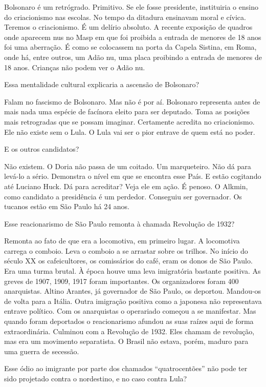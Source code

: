  Bolsonaro é um retrógrado. Primitivo. Se ele fosse presidente,
instituiria o ensino do criacionismo nas escolas. No tempo da ditadura
ensinavam moral e cívica. Teremos o criacionismo. É um delírio absoluto.
A recente exposição de quadros onde aparecem nus no Masp em que foi
proibida a entrada de menores de 18 anos foi uma aberração. É como se
colocassem na porta da Capela Sistina, em Roma, onde há, entre outros,
um Adão nu, uma placa proibindo a entrada de menores de 18 anos.
Crianças não podem ver o Adão nu.

 Essa mentalidade cultural explicaria a ascensão de Bolsonaro?

 Falam no fascismo de Bolsonaro. Mas não é por aí. Bolsonaro
representa antes de mais nada uma espécie de facínora eleito para ser
deputado. Toma as posições mais retrogradas que se possam imaginar.
Certamente acredita no criacionismo. Ele não existe sem o Lula. O Lula
vai ser o pior entrave de quem está no poder.

 E os outros candidatos?

 Não existem. O Doria não passa de um coitado. Um marqueteiro. Não dá
para levá-lo a sério. Demonstra o nível em que se encontra esse País. E
estão cogitando até Luciano Huck. Dá para acreditar? Veja ele em ação. É
penoso. O Alkmin, como candidato a presidência é um perdedor. Conseguiu
ser governador. Os tucanos estão em São Paulo há 24 anos.

 Esse reacionarismo de São Paulo remonta à chamada Revolução de 1932?

 Remonta ao fato de que era a locomotiva, em primeiro lugar. A
locomotiva carrega o comboio. Leva o comboio a se arrastar sobre os
trilhos. No início do século XX os cafeicultores, os comissários do
café, eram os donos de São Paulo. Era uma turma brutal. À época houve
uma leva imigratória bastante positiva. As greves de 1907, 1909, 1917
foram importantes. Os organizadores foram 400 anarquistas. Altino
Arantes, já governador de São Paulo, os deportou. Mandou-os de volta
para a Itália. Outra imigração positiva como a japonesa não representava
entrave político. Com os anarquistas o operariado começou a se
manifestar. Mas quando foram deportados o reacionarismo afundou as suas
raízes aqui de forma extraordinária. Culminou com a Revolução de 1932.
Eles chamam de revolução, mas era um movimento separatista. O Brasil não
estava, porém, maduro para uma guerra de secessão.

 Esse ódio ao imigrante por parte dos chamados ``quatrocentões'' não
pode ter sido projetado contra o nordestino, e no caso contra Lula?


